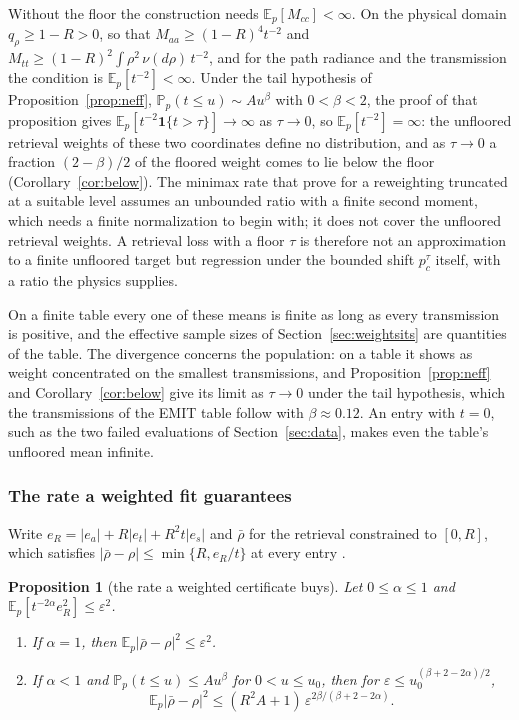 \documentclass[11pt]{article}
\newtheorem{proposition}[lemma]{Proposition}
\theoremstyle{remark}
\newcommand{\E}{\mathbb{E}}
\newcommand{\Prob}{\mathbb{P}}
\newcommand{\1}{\mathbf{1}}
\begin{document}
Without the floor the construction needs $\E_p[M_{cc}]<\infty$. On the physical domain $q_\rho\ge1-R>0$, so that
$M_{aa}\ge(1-R)^4t^{-2}$ and $M_{tt}\ge(1-R)^2\int\rho^2\,\nu(d\rho)\,t^{-2}$, and for the path radiance and the
transmission the condition is $\E_p[t^{-2}]<\infty$. Under the tail hypothesis of Proposition~\ref{prop:neff},
$\Prob_p(t\le u)\sim Au^\beta$ with $0<\beta<2$, the proof of that proposition gives
$\E_p[t^{-2}\1\{t>\tau\}]\to\infty$ as $\tau\to0$, so $\E_p[t^{-2}]=\infty$: the unfloored retrieval weights of these two
coordinates define no distribution, and as $\tau\to0$ a fraction $(2-\beta)/2$ of the floored weight comes to lie below
the floor (Corollary~\ref{cor:below}). The minimax rate that \cite{mpw} prove for a reweighting truncated at a suitable
level assumes an unbounded ratio with a finite second moment, which needs a finite normalization to begin with; it does
not cover the unfloored retrieval weights. A retrieval loss with a floor $\tau$ is therefore not an approximation to a
finite unfloored target but regression under the bounded shift $p^\tau_c$ itself, with a ratio the physics supplies.

On a finite table every one of these means is finite as long as every transmission is positive, and the effective
sample sizes of Section~\ref{sec:weightsits} are quantities of the table. The divergence concerns the population: on a
table it shows as weight concentrated on the smallest transmissions, and Proposition~\ref{prop:neff} and
Corollary~\ref{cor:below} give its limit as $\tau\to0$ under the tail hypothesis, which the transmissions of the EMIT
table follow with $\beta\approx0.12$. An entry with $t=0$, such as the two failed evaluations of Section~\ref{sec:data},
makes even the table's unfloored mean infinite.

\subsubsection{The rate a weighted fit guarantees}

Write $e_R=|e_a|+R|e_t|+R^2t|e_s|$ and $\bar\rho$ for the retrieval constrained to $[0,R]$, which satisfies
$|\bar\rho-\rho|\le\min\{R,e_R/t\}$ at every entry \cite{shmalo2}.

\begin{proposition}[the rate a weighted certificate buys]\label{prop:weighted-rate}
Let $0\le\alpha\le1$ and $\E_p[t^{-2\alpha}e_R^2]\le\varepsilon^2$.
\begin{enumerate}
\item If $\alpha=1$, then $\E_p|\bar\rho-\rho|^2\le\varepsilon^2$.
\item If $\alpha<1$ and $\Prob_p(t\le u)\le Au^\beta$ for $0<u\le u_0$, then for $\varepsilon\le
u_0^{(\beta+2-2\alpha)/2}$,
\[
\E_p|\bar\rho-\rho|^2\le(R^2A+1)\,\varepsilon^{2\beta/(\beta+2-2\alpha)} .
\]
\end{enumerate}
\end{proposition}
\end{document}
